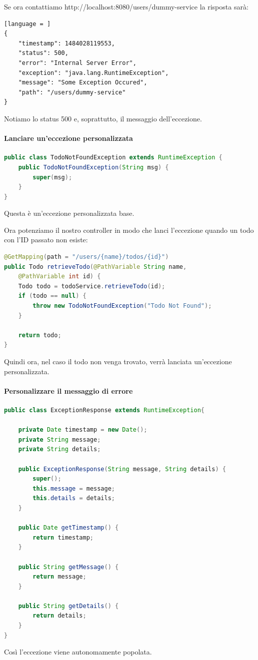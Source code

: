 \documentclass[11pt,a4paper]{book}
\begin{document}
Se ora contattiamo http://localhost:8080/users/dummy-service la risposta sarà:
\begin{lstlisting}[language = ]
{
	"timestamp": 1484028119553,
	"status": 500,
	"error": "Internal Server Error",
	"exception": "java.lang.RuntimeException",
	"message": "Some Exception Occured",
	"path": "/users/dummy-service"
}
\end{lstlisting}

Notiamo lo status 500 e, soprattutto, il messaggio dell'eccezione.

\paragraph{Lanciare un'eccezione personalizzata}
\begin{lstlisting}[language = Java]
public class TodoNotFoundException extends RuntimeException {
	public TodoNotFoundException(String msg) {
		super(msg);
	}
}
\end{lstlisting}
Questa è un'eccezione personalizzata base.

Ora potenziamo il nostro controller in modo che lanci l'eccezione quando un todo con l'ID passato non esiste:
\begin{lstlisting}[language = Java]
@GetMapping(path = "/users/{name}/todos/{id}")
public Todo retrieveTodo(@PathVariable String name,
	@PathVariable int id) {
	Todo todo = todoService.retrieveTodo(id);
	if (todo == null) {
		throw new TodoNotFoundException("Todo Not Found");
	}
	
	return todo;
}
\end{lstlisting}
Quindi ora, nel caso il todo non venga trovato, verrà lanciata un'eccezione personalizzata.

\paragraph{Personalizzare il messaggio di errore}
\begin{lstlisting}[language = Java]
public class ExceptionResponse extends RuntimeException{
	
	private Date timestamp = new Date();
	private String message;
	private String details;

	public ExceptionResponse(String message, String details) {
		super();
		this.message = message;
		this.details = details;
	}
	
	public Date getTimestamp() {
		return timestamp;
	}

	public String getMessage() {
		return message;
	}
	
	public String getDetails() {
		return details;
	}
}
\end{lstlisting}
Così l'eccezione viene autonomamente popolata.
\end{document}
